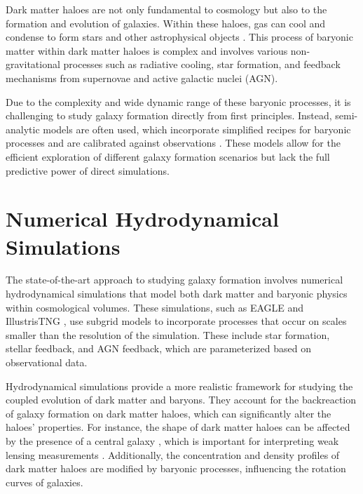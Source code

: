 Dark matter haloes are not only fundamental to cosmology but also to the formation and evolution of galaxies. Within these haloes, gas can cool and condense to form stars and other astrophysical objects \citep{1988MNRAS.234..459S,1998MNRAS.295..319M}. This process of baryonic matter within dark matter haloes is complex and involves various non-gravitational processes such as radiative cooling, star formation, and feedback mechanisms from supernovae and active galactic nuclei (AGN).

Due to the complexity and wide dynamic range of these baryonic processes, it is challenging to study galaxy formation directly from first principles. Instead, semi-analytic models are often used, which incorporate simplified recipes for baryonic processes and are calibrated against observations \citep{2015ARA&A..53...51S}. These models allow for the efficient exploration of different galaxy formation scenarios but lack the full predictive power of direct simulations.

\section{Numerical Hydrodynamical Simulations}

The state-of-the-art approach to studying galaxy formation involves numerical hydrodynamical simulations that model both dark matter and baryonic physics within cosmological volumes. These simulations, such as EAGLE \citep{2015Schaye_EAGLE} and IllustrisTNG \citep{2018MNRAS.480.5113M}, use subgrid models to incorporate processes that occur on scales smaller than the resolution of the simulation. These include star formation, stellar feedback, and AGN feedback, which are parameterized based on observational data.

Hydrodynamical simulations provide a more realistic framework for studying the coupled evolution of dark matter and baryons. They account for the backreaction of galaxy formation on dark matter haloes, which can significantly alter the haloes' properties. For instance, the shape of dark matter haloes can be affected by the presence of a central galaxy \citep{2010MNRAS.407..435A,2021MNRAS.501.5679C}, which is important for interpreting weak lensing measurements \citep{2021A&A...647A.185G}. Additionally, the concentration and density profiles of dark matter haloes are modified by baryonic processes, influencing the rotation curves of galaxies.


